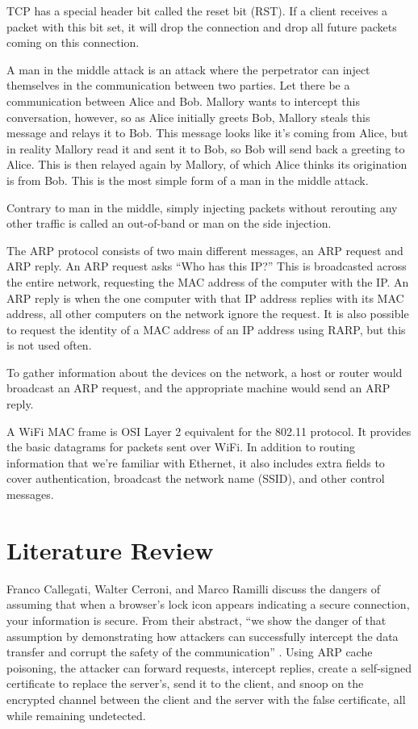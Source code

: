 \documentclass[journal]{IEEEtran}
\begin{document}
TCP has a special header bit called the reset bit (RST). If a client receives a packet with this bit set, it will drop the connection and drop all future packets coming on this connection. 

A man in the middle attack is an attack where the perpetrator can inject themselves in the communication between two parties. Let there be a communication between Alice and Bob. Mallory wants to intercept this conversation, however, so as Alice initially greets Bob, Mallory steals this message and relays it to Bob. This message looks like it's coming from Alice, but in reality Mallory read it and sent it to Bob, so Bob will send back a greeting to Alice. This is then relayed again by Mallory, of which Alice thinks its origination is from Bob. This is the most simple form of a man in the middle attack.

Contrary to man in the middle, simply injecting packets without rerouting any other traffic is called an out-of-band or man on the side injection.

The ARP protocol consists of two main different messages, an ARP request and ARP reply. An ARP request asks ``Who has this IP?'' This is broadcasted across the entire network, requesting the MAC address of the computer with the IP. An ARP reply is when the one computer with that IP address replies with its MAC address, all other computers on the network ignore the request. It is also possible to request the identity of a MAC address of an IP address using RARP, but this is not used often.

To gather information about the devices on the network, a host or router would broadcast an ARP request, and the appropriate machine would send an ARP reply.

A WiFi MAC frame is OSI Layer 2 equivalent for the 802.11 protocol. It provides the basic datagrams for packets sent over WiFi. In addition to routing information that we're familiar with Ethernet, it also includes extra fields to cover authentication, broadcast the network name (SSID), and other control messages.

\section{Literature Review}
Franco Callegati, Walter Cerroni, and Marco Ramilli discuss the dangers of assuming that when a browser's lock icon appears indicating a secure connection, your information is secure. From their abstract, ``we show the danger of that assumption by demonstrating how attackers can successfully intercept the data transfer and corrupt the safety of the communication'' \cite{MITM}. Using ARP cache poisoning, the attacker can forward requests, intercept replies, create a self-signed certificate to replace the server's, send it to the client, and snoop on the encrypted channel between the client and the server with the false certificate, all while remaining undetected.
\end{document}
